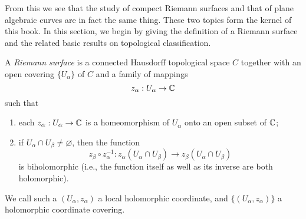 From this we see that the study of compect Riemann surfaces and that of plane algebraic curves are in fact the same thing. These two topics form the kernel of this book. In this section, we begin by giving the definition of a Riemann surface and the related basic results on topological classification. 
\begin{definition}
    A \textit{Riemann surface} is a connected Hausdorff topological space $C$ together with an open covering $\{U_\alpha\}$ of $C$ and a family of mappings 
    \[z_\alpha:U_\alpha\to\mathbb{C}\]
    such that
    \begin{enumerate}
        \item each $z_\alpha:U_\alpha\to\mathbb{C}$ is a homeomorphism of $U_\alpha$ onto an open subset of $\mathbb{C}$; 
        \item if $U_\alpha\cap U_\beta\neq\varnothing$, then the function 
        \[z_\beta\circ z_\alpha^{-1}:z_\alpha(U_\alpha\cap U_\beta)\to z_\beta(U_\alpha\cap U_\beta)\]
        is biholomorphic (i.e., the function itself as well as its inverse are both holomorphic). 
    \end{enumerate}
    We call such a $(U_\alpha,z_\alpha)$ a local holomorphic coordinate, and $\{(U_\alpha,z_\alpha)\}$ a holomorphic coordinate covering. 
\end{definition}

